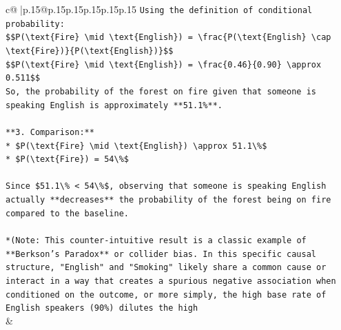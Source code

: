 \documentclass{article}
\begin{document}
{\begin{supertabular}{c@{$\;$}|p{.15\linewidth}@{}p{.15\linewidth}p{.15\linewidth}p{.15\linewidth}p{.15\linewidth}p{.15\linewidth}}
{{{\texttt{Using the definition of conditional probability:} \\
\texttt{\$\$P(\textbackslash{}text\{Fire\} \textbackslash{}mid \textbackslash{}text\{English\}) = \textbackslash{}frac\{P(\textbackslash{}text\{English\} \textbackslash{}cap \textbackslash{}text\{Fire\})\}\{P(\textbackslash{}text\{English\})\}\$\$} \\
\texttt{\$\$P(\textbackslash{}text\{Fire\} \textbackslash{}mid \textbackslash{}text\{English\}) = \textbackslash{}frac\{0.46\}\{0.90\} \textbackslash{}approx 0.511\$\$} \\
\texttt{So, the probability of the forest on fire given that someone is speaking English is approximately **51.1\%**.} \\
\\ 
\texttt{**3. Comparison:**} \\
\texttt{*   \$P(\textbackslash{}text\{Fire\} \textbackslash{}mid \textbackslash{}text\{English\}) \textbackslash{}approx 51.1\textbackslash{}\%\$} \\
\texttt{*   \$P(\textbackslash{}text\{Fire\}) = 54\textbackslash{}\%\$} \\
\\ 
\texttt{Since \$51.1\textbackslash{}\% < 54\textbackslash{}\%\$, observing that someone is speaking English actually **decreases** the probability of the forest being on fire compared to the baseline.} \\
\\ 
\texttt{*(Note: This counter{-}intuitive result is a classic example of **Berkson's Paradox** or collider bias. In this specific causal structure, "English" and "Smoking" likely share a common cause or interact in a way that creates a spurious negative association when conditioned on the outcome, or more simply, the high base rate of English speakers (90\%) dilutes the high} \\
            }
        }
    }
    & \\ \\


\end{supertabular}}
\end{document}
